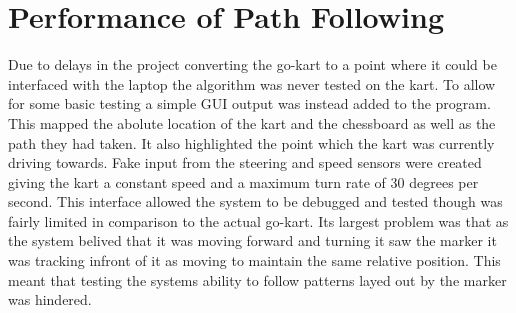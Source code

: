 \section{Performance of Path Following}

Due to delays in the project converting the go-kart to a point where it could be interfaced with the laptop the algorithm was never tested on the kart. To allow for some basic testing a simple GUI output was instead added to the program. This mapped the abolute location of the kart and the chessboard as well as the path they had taken. It also highlighted the point which the kart was currently driving towards. Fake input from the steering and speed sensors were created giving the kart a constant speed and a maximum turn rate of 30 degrees per second. This interface allowed the system to be debugged and tested though was fairly limited in comparison to the actual go-kart. Its largest problem was that as the system belived that it was moving forward and turning it saw the marker it was tracking infront of it as moving to maintain the same relative position. This meant that testing the systems ability to follow patterns layed out by the marker was hindered.